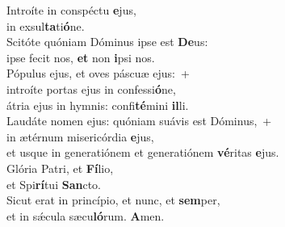 \evenverse Introíte in conspéctu \textbf{e}jus,~\*\\
\evenverse in exsul\textbf{ta}ti\textbf{ó}ne.\\
\oddverse Scitóte quóniam Dóminus ipse est \textbf{De}us:~\*\\
\oddverse ipse fecit nos, \textbf{et} non \textbf{i}psi nos.\\
\evenverse Pópulus ejus, et oves páscuæ ejus:~+\\
\evenverse  introíte portas ejus in confessi\textbf{ó}ne,~\*\\
\evenverse átria ejus in hymnis: confi\textbf{té}mini \textbf{il}li.\\
\oddverse Laudáte nomen ejus: quóniam suávis est Dóminus,~+\\
\oddverse  in ætérnum misericórdia \textbf{e}jus,~\*\\
\oddverse et usque in generatiónem et generatiónem \textbf{vé}ritas \textbf{e}jus.\\
\evenverse Glória Patri, et \textbf{Fí}lio,~\*\\
\evenverse et Spi\textbf{rí}tui \textbf{San}cto.\\
\oddverse Sicut erat in princípio, et nunc, et \textbf{sem}per,~\*\\
\oddverse et in sǽcula sæcu\textbf{ló}rum. \textbf{A}men.\\
